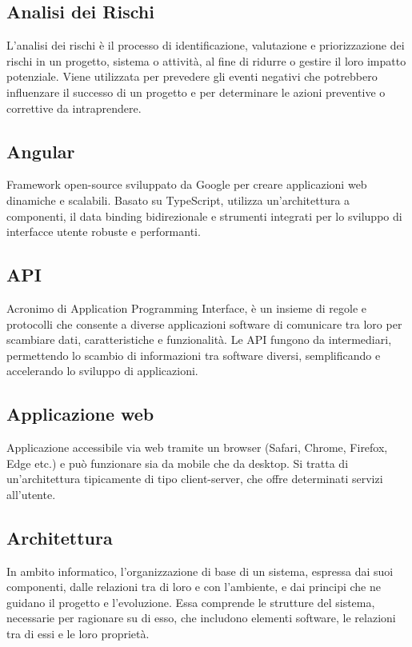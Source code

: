 \subsection*{Analisi dei Rischi}
L'analisi dei rischi è il processo di identificazione, valutazione e priorizzazione dei rischi in un progetto, sistema o attività, al fine di ridurre 
o gestire il loro impatto potenziale. Viene utilizzata per prevedere gli eventi negativi che potrebbero influenzare il successo di un progetto e per 
determinare le azioni preventive o correttive da intraprendere.

\hypertarget{sec:angular}{}
\subsection*{Angular}
Framework open-source sviluppato da Google per creare applicazioni web dinamiche e scalabili. Basato su TypeScript, utilizza un'architettura a componenti, 
il data binding bidirezionale e strumenti integrati per lo sviluppo di interfacce utente robuste e performanti.

\hypertarget{sec:api}{}
\subsection*{API}
Acronimo di Application Programming Interface, è un insieme di regole e protocolli che consente a diverse applicazioni software di comunicare tra loro 
per scambiare dati, caratteristiche e funzionalità. Le API fungono da intermediari, permettendo lo scambio di informazioni tra software diversi, semplificando 
e accelerando lo sviluppo di applicazioni.

\hypertarget{sec:applicazione_web}{}
\subsection*{Applicazione web}
Applicazione accessibile via web tramite un browser (Safari, Chrome, Firefox, Edge etc.) e può funzionare sia da mobile che da desktop. Si tratta di un'architettura 
tipicamente di tipo client-server, che offre determinati servizi all'utente.

\hypertarget{sec:architettura}{}
\subsection*{Architettura}
In ambito informatico, l'organizzazione di base di un sistema, espressa dai suoi componenti, dalle relazioni tra di loro e con l'ambiente, 
e dai principi che ne guidano il progetto e l'evoluzione. Essa comprende le strutture del sistema, necessarie per ragionare su di esso, 
che includono elementi software, le relazioni tra di essi e le loro proprietà.

